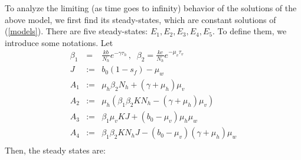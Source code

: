 \documentclass[12pt,leqno]{article}
\newcommand{\brn}{\mathcal{R}_0}
\begin{document}
To analyze the limiting (as time goes to infinity) behavior of the solutions of the above model, we first find its steady-states, which are constant solutions of (\ref{models}). There are five steady-states: $E_1, E_2, E_3, E_4, E_5$. To define them, we introduce some notations. Let
\begin{eqnarray*}
\beta_1 &=& \frac{kb}{N_h}e^{-\gamma\tau_h}\,,\;\;\beta_2 = \frac{kc}{N_h}e^{-\mu_v\tau_v}\\
J &:=& b_0(1-s_f) - \mu_w\\
A_1 &:=& \mu_h\beta_2N_h + (\gamma + \mu_h)\mu_v\\
A_2 &:=& \mu_h(\beta_1\beta_2 KN_h - (\gamma +\mu_h)\mu_v)\\
A_3 %
&:=& \beta_1\mu_vKJ + (b_0-\mu_v)\mu_h\mu_w\\
A_4 %
&:=& \beta_1\beta_2 KN_h J - (b_0-\mu_v)(\gamma+\mu_h)\mu_w\\
\end{eqnarray*}
Then, the steady states are:
\end{document}
